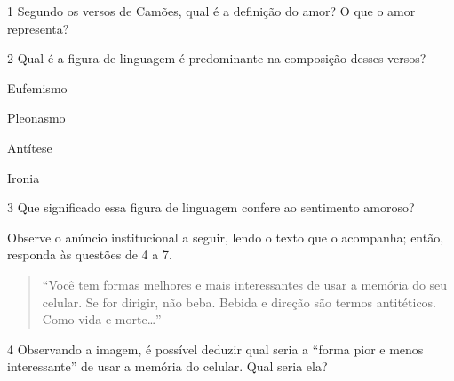 

\num{1} Segundo os versos de Camões, qual é a definição do amor? O que o
amor representa?


\num{2} Qual é a figura de linguagem é predominante na composição desses versos?

\begin{boxlist}
 Eufemismo

 Pleonasmo

 Antítese

 Ironia
\end{boxlist}

\num{3} Que significado essa figura de linguagem confere ao sentimento
amoroso?


Observe o anúncio institucional a seguir, lendo o texto que o acompanha;
então, responda às questões de 4 a 7.


\begin{quote}
``Você tem formas melhores e mais interessantes de usar a memória do seu
celular. Se for dirigir, não beba. Bebida e direção são termos
antitéticos. Como vida e morte\ldots{}''
\end{quote}

\num{4} Observando a imagem, é possível deduzir qual seria a ``forma
pior e menos interessante'' de usar a memória do celular. Qual seria
ela?


